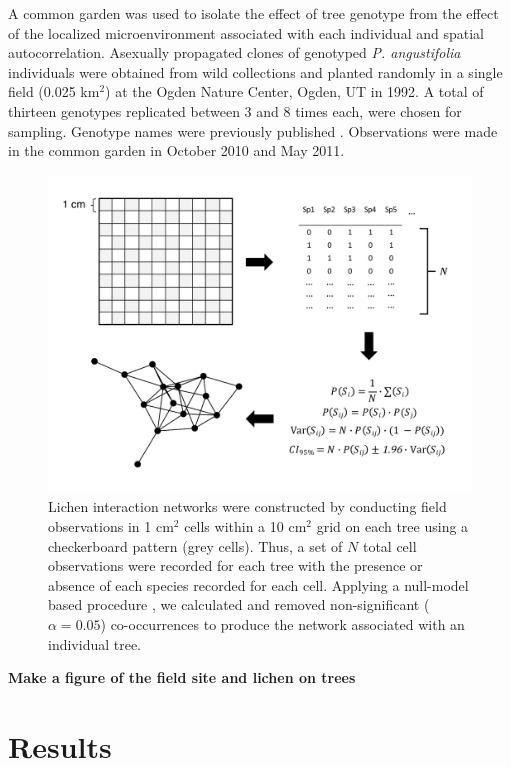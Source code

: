 \documentclass[fleqn,10pt]{wlscirep}
\begin{document}
A common garden was used to isolate the effect of tree genotype from
the effect of the localized microenvironment associated with each
individual and spatial autocorrelation. Asexually propagated clones of
genotyped \textit{P. angustifolia} individuals were obtained from wild
collections and planted randomly in a single field (0.025 km$^2$) at
the Ogden Nature Center, Ogden, UT in 1992. A total of thirteen
genotypes replicated between 3 and 8 times each, were chosen for
sampling. Genotype names were previously published
\cite{Martinsen}. Observations were made in the common garden in
October 2010 and May 2011.


\begin{figure}[ht]
\centering
\includegraphics[width=\linewidth]{conet_method.pdf}
\caption{Lichen interaction networks were constructed by conducting
  field observations in 1 cm$^2$ cells within a 10 cm$^2$ grid on each
  tree using a checkerboard pattern (grey cells). Thus, a set of $N$
  total cell observations were recorded for each tree with the
  presence or absence of each species recorded for each cell. Applying
  a null-model based procedure \cite{Araujo2011}, we calculated and
  removed non-significant ($\alpha = 0.05$) co-occurrences to produce
  the network associated with an individual tree.}
\label{fig:conet_method}
\end{figure}


\textbf{Make a figure of the field site and lichen on trees}


\section*{Results}
\end{document}
